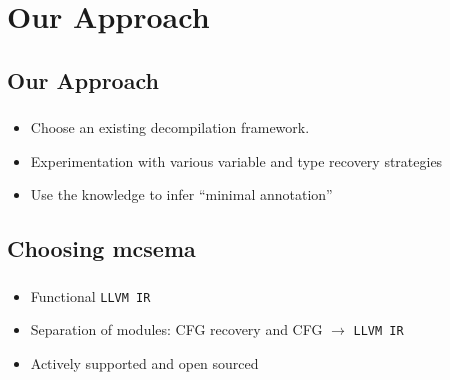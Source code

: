 \documentclass[mathserif,10pt]{beamer}
\newcommand{\LIR}{{\tt LLVM IR}}
\begin{document}
\section{Our Approach}
  \subsection*{Our Approach}
  \frame
  {
    \frametitle{\subsecname}
    \begin{itemize}
      \item Choose an existing decompilation framework.
      \item Experimentation with various variable and type recovery strategies
      \item Use the knowledge to infer ``minimal annotation''
    \end{itemize}

  }

  \subsection{Choosing mcsema}
  \frame
  {
    \frametitle{\subsecname}
    \begin{itemize}
      \item Functional \LIR
      \item Separation of modules: CFG recovery and CFG $\rightarrow$ \LIR
      \item Actively supported and open sourced
    \end{itemize}

    \begin{figure}[h]
      \centering
    \end{figure}
  }
\end{document}

